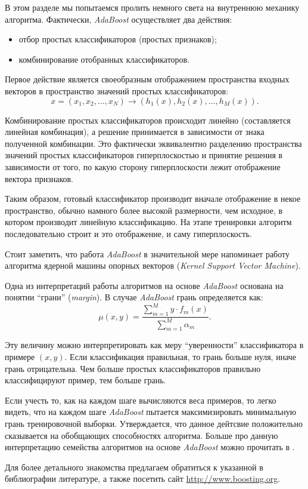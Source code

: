 В этом разделе мы попытаемся пролить немного света на внутреннюю механику алгоритма. Фактически, \emph{AdaBoost} осуществляет два действия:
\begin{itemize}
  \item отбор простых классификаторов (простых признаков);
  \item комбинирование отобранных классификаторов.
\end{itemize}

Первое действие является своеобразным отображением пространства входных векторов в пространство значений простых классификаторов:
\begin{displaymath}
  x = (x_1, x_2, \dots, x_N) \to (h_1(x), h_2(x), \dots, h_M(x)).
\end{displaymath}

Комбинирование простых классификаторов происходит линейно (составляется линейная комбинация), а решение принимается в зависимости от знака полученной комбинации. Это фактически эквивалентно разделению пространства значений простых классификаторов гиперплоскостью и принятие решения в зависимости от того, по какую сторону гиперплоскости лежит отображение вектора признаков.

Таким образом, готовый классификатор производит вначале отображение в некое пространство, обычно намного более высокой размерности, чем исходное, в котором производит линейную классификацию. На этапе тренировки алгоритм последовательно строит и это отображение, и саму гиперплоскость.

Стоит заметить, что работа \emph{AdaBoost} в значительной мере напоминает работу алгоритма ядерной машины опорных векторов (\emph{Kernel Support Vector Machine}).

Одна из интерпретаций работы алгоритмов на основе \emph{AdaBoost} основана на понятии ``грани'' (\emph{margin}). В случае \emph{AdaBoost} грань определяется как:
\begin{displaymath}
  \mu(x, y) = \frac{\sum_{m = 1}^M{y \cdot f_m(x)}}{\sum_{m = 1}^M{\alpha_m}}.
\end{displaymath}

Эту величину можно интерпретировать как меру ``уверенности'' классификатора в примере $(x, y)$. Если классификация правильная, то грань больше нуля, иначе грань отрицательна. Чем больше простых классификаторов правильно классифицируют пример, тем больше грань.

Если учесть то, как на каждом шаге вычисляются веса примеров, то легко видеть, что на каждом шаге \emph{AdaBoost} пытается максимизировать минимальную грань тренировочной выборки. Утверждается, что данное дейтсвие положительно сказывается на обобщающих способностях алгоритма. Больше про данную интерпретацию семейства алгоритмов на основе \emph{AdaBoost} можно прочитать в \cite{rosset04}.

Для более детального знакомства предлагаем обратиться к указанной в библиографии литературе, а также посетить сайт \url{http://www.boosting.org}.

\newpage
